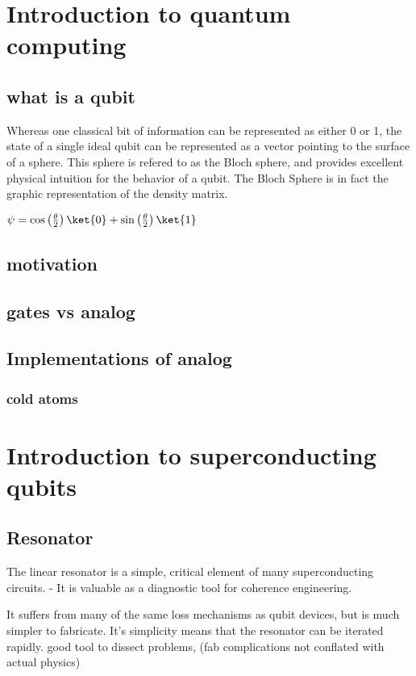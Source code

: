 \section{Introduction to quantum computing}
\subsection{what is a qubit}

Whereas one classical bit of information can be represented as either 0 or 1, the state of a single ideal qubit can be represented as a vector pointing to the surface of a sphere.
This sphere is refered to as the Bloch sphere, and provides excellent physical intuition for the behavior of a qubit.
The Bloch Sphere is in fact the graphic representation of the density matrix.

$\psi = \cos \left( \frac{\theta}{2} \right) \ket{0} + \sin \left( \frac{\theta}{2} \right)\ket{1} $


\subsection{motivation}
\subsection{gates vs analog}
\subsection{Implementations of analog}
\subsubsection{cold atoms}
\section{Introduction to superconducting qubits}
\subsection{Resonator}
The linear resonator is a simple, critical element of many superconducting circuits.
- It is valuable as a diagnostic tool for coherence engineering.

It suffers from many of the same loss mechanisms as qubit devices, but is much simpler to fabricate.
It's simplicity means that the resonator can be iterated rapidly.
good tool to dissect problems, (fab complications not conflated with actual physics)

